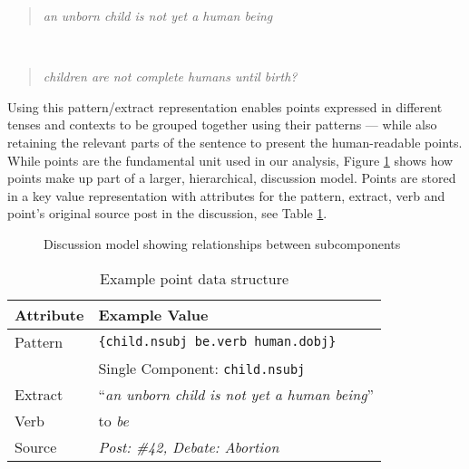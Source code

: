     \smallskip
    \begin{center}
      \blockquote{\textit{an unborn child is not yet a human being}} \\ \blockquote{\textit{children are not complete humans until birth?}}
    \end{center}
    \smallskip

    Using this pattern/extract representation enables points expressed in different tenses and contexts to be grouped together using their patterns --- while also retaining the relevant parts of the sentence to present the human-readable points. While points are the fundamental unit used in our analysis, Figure \ref{fig:discmod} shows how points make up part of a larger, hierarchical, discussion model. Points are stored in a key value representation with attributes for the pattern, extract, verb and point's original source post in the discussion, see Table \ref{tab:point-keyval}.

    \begin{figure}
      \centering
      \caption{Discussion model showing relationships between subcomponents}

      \label{fig:discmod}
    \end{figure}

    \begin{table}[]
      \centering
      \caption{Example point data structure}
      \label{tab:point-keyval}
      \begin{tabular}{|l|l|}
        \hline
        \textbf{Attribute}       & \textbf{Example Value}                         \\ \hline
        Pattern                  & \texttt{\{child.nsubj be.verb human.dobj\}} \\
                                 & Single Component: \texttt{child.nsubj}         \\ \hline
        Extract                  & ``\textit{an unborn child is not yet a human being}''               \\ \hline
        Verb                     & to \textit{be}                               \\ \hline
        Source                   & \textit{Post: \#42, Debate: Abortion}          \\ \hline
      \end{tabular}
    \end{table}

